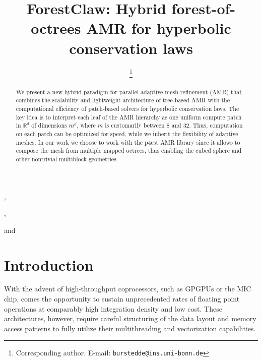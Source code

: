 \documentclass{IOS-Book-Article}     %
\newcommand{\sR}{\mathbb{R}}
\begin{document}
\begin{frontmatter}          %
%
\title{ForestClaw:
        Hybrid forest-of-octrees AMR for hyperbolic conservation laws}

%
\author[A]{ %
\thanks{Corresponding author.  E-mail: \texttt{burstedde@ins.uni-bonn.de}}},
\author[B]{ },
\author[C]{ } and
\author[C]{ }
\address[A]{Institut f\"ur Numerische Simulation, Universit\"at Bonn, Germany}
\address[B]{Boise State University, Idaho, USA}
\address[C]{Institute for Computational Engineering and Sciences,\\
The University of Texas at Austin, USA}

\begin{abstract}
%
We present a new hybrid paradigm for parallel adaptive mesh refinement (AMR)
that combines the scalability and lightweight architecture of tree-based AMR
with the computational efficiency of patch-based solvers for hyperbolic
conservation laws.  The key idea is to interpret each leaf of the AMR hierarchy
as one uniform compute patch in $\sR^d$ of dimensions $m^d$, where $m$ is
customarily between 8 and 32.  Thus, computation on each patch can be optimized
for speed, while we inherit the flexibility of adaptive meshes.  In our work we
choose to work with the p4est AMR library since it allows to compose the mesh
from multiple mapped octrees, thus enabling the cubed sphere and other
nontrivial multiblock geometries.
%
\end{abstract}


\end{frontmatter}


\section*{Introduction}

With the advent of high-throughput coprocessors, such as GPGPUs or the MIC
chip, comes the opportunity to sustain unprecedented rates of floating point
operations at comparably high integration density and low cost.  These
architectures, however, require careful structuring of the data layout and
memory access patterns to fully utilize their multithreading and vectorization
capabilities.
\end{document}
